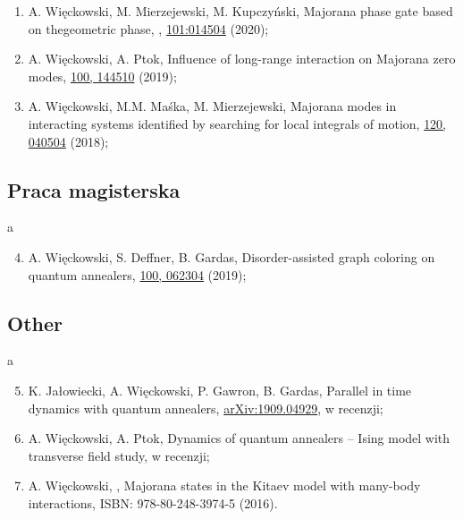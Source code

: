 \begin{enumerate}

\item A. Więckowski, M. Mierzejewski, M. Kupczyński,
    Majorana phase gate based on thegeometric phase,
    \href{http://dx.doi.org/10.1103/PhysRevB.101.014504}{},
    \href{http://dx.doi.org/10.1103/PhysRevB.101.014504}{101:014504} (2020);

\item  A. Więckowski, A. Ptok, Influence of long-range interaction on Majorana zero modes, \href{https://journals.aps.org/prb/abstract/10.1103/PhysRevB.100.144510}{ 100, 144510} (2019);

\item A. Więckowski, M.M. Maśka, M. Mierzejewski, Majorana modes in interacting systems identified by searching for local integrals of motion, 
\href{https://journals.aps.org/prl/abstract/10.1103/PhysRevLett.120.040504}{ 120, 040504} (2018);

\end{enumerate}
\subsection*{Praca magisterska}

\phantom a
\vspace{-5ex}

\begin{enumerate}
\setcounter{enumi}{3}

\item  A. Więckowski, S. Deffner, B. Gardas, Disorder-assisted graph coloring on quantum annealers, \href{https://journals.aps.org/pra/abstract/10.1103/PhysRevA.100.062304}{ 100, 062304} (2019);


\end{enumerate}


\subsection*{Other}

\phantom a
\vspace{-5ex}

\begin{enumerate}

\setcounter{enumi}{4}

\item  K. Jałowiecki, A. Więckowski, P. Gawron, B. Gardas, Parallel in time dynamics with quantum annealers, \href{https://arxiv.org/pdf/1909.04929.pdf}{arXiv:1909.04929}, w recenzji;

\item  A. Więckowski, A. Ptok, Dynamics of quantum annealers – Ising model with transverse field study, w recenzji;

\item A. Więckowski, , Majorana states in the Kitaev model with many-body interactions, ISBN: 978-80-248-3974-5 (2016).
\end{enumerate}

